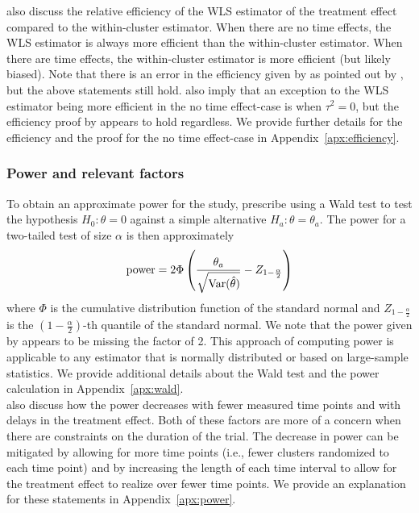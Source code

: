 \documentclass[10pt]{article}
\begin{document}
\citeauthor{Hussey:2007} also discuss the relative efficiency of the WLS estimator of the treatment effect compared to the within-cluster estimator. When there are no time effects, the WLS estimator is always more efficient than the within-cluster estimator. When there are time effects, the within-cluster estimator is more efficient (but likely biased). Note that there is an error in the efficiency given by \textcite{Hussey:2007} as pointed out by \textcite{Liao:2015}, but the above statements still hold. \textcite{Hussey:2007} also imply that an exception to the WLS estimator being more efficient in the no time effect-case is when $\tau^2=0$, but the efficiency proof by \textcite{Liao:2015} appears to hold regardless. We provide further details for the efficiency and the proof for the no time effect-case in Appendix~\ref{apx:efficiency}.

\subsubsection{Power and relevant factors}

To obtain an approximate power for the study, \textcite{Hussey:2007} prescribe using a Wald test to test the hypothesis $H_0:\theta=0$ against a simple alternative $H_a: \theta=\theta_a$. The power for a two-tailed test of size $\alpha$ is then approximately
\[
\text{power} = 2\Phi\left(\frac{\theta_a}{\sqrt{\mathrm{Var}(\hat{\theta})}} - Z_{1-\frac{\alpha}{2}}\right)
\]
where $\Phi$ is the cumulative distribution function of the standard normal and $Z_{1-\frac{\alpha}{2}}$ is the $\left(1-\frac{\alpha}{2}\right)$-th quantile of the standard normal. We note that the power given by \textcite{Hussey:2007} appears to be missing the factor of 2. This approach of computing power is applicable to any estimator that is normally distributed or based on large-sample statistics. We provide additional details about the Wald test and the power calculation in Appendix~\ref{apx:wald}.
\\

\citeauthor{Hussey:2007} also discuss how the power decreases with fewer measured time points and with delays in the treatment effect. Both of these factors are more of a concern when there are constraints on the duration of the trial. The decrease in power can be mitigated by allowing for more time points (i.e., fewer clusters randomized to each time point) and by increasing the length of each time interval to allow for the treatment effect to realize over fewer time points. We provide an explanation for these statements in Appendix~\ref{apx:power}.
\end{document}
